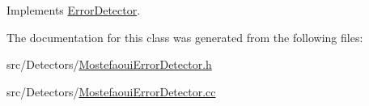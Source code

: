 Implements \hyperlink{classErrorDetector_afc717d04768dd207196c08e24163115c}{Error\+Detector}.



The documentation for this class was generated from the following files\+:\begin{DoxyCompactItemize}
\item 
src/\+Detectors/\hyperlink{MostefaouiErrorDetector_8h}{Mostefaoui\+Error\+Detector.\+h}\item 
src/\+Detectors/\hyperlink{MostefaouiErrorDetector_8cc}{Mostefaoui\+Error\+Detector.\+cc}\end{DoxyCompactItemize}
